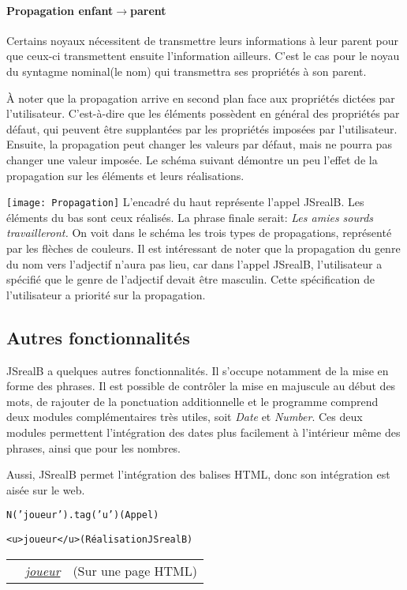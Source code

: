 \documentclass[11pt]{article} %
\newcommand{\real}[1]{\emph{#1}}
\begin{document}
\paragraph{Propagation enfant$\rightarrow$parent}

Certains noyaux nécessitent de transmettre leurs informations à leur
parent pour que ceux-ci transmettent ensuite l'information ailleurs.
C'est le cas pour le noyau du syntagme nominal(le nom) qui transmettra
ses propriétés à son parent.

À noter que la propagation arrive en second plan face aux propriétés
dictées par l'utilisateur. C'est-à-dire que les éléments possèdent
en général des propriétés par défaut, qui peuvent être supplantées
par les propriétés imposées par l'utilisateur. Ensuite, la propagation
peut changer les valeurs par défaut, mais ne pourra pas changer une
valeur imposée. Le schéma suivant démontre un peu l'effet de la propagation
sur les éléments et leurs réalisations.

\texttt{[image: Propagation]}
L'encadré du haut représente l'appel JSrealB. Les éléments du bas sont ceux
réalisés. La phrase finale serait: \real{Les amies sourds travailleront.}
On voit dans le schéma les trois types de propagations, représenté
par les flèches de couleurs. Il est intéressant de noter que la propagation
du genre du nom vers l'adjectif n'aura pas lieu, car dans l'appel
JSrealB, l'utilisateur a spécifié que le genre de l'adjectif devait
être masculin. Cette spécification de l'utilisateur a priorité sur
la propagation.

\subsection{Autres fonctionnalités}

JSrealB a quelques autres fonctionnalités. Il s'occupe notamment de
la mise en forme des phrases. Il est possible de contrôler la mise
en majuscule au début des mots, de rajouter de la ponctuation additionnelle
et le programme comprend deux modules complémentaires très utiles,
soit \emph{Date} et \emph{Number}. Ces deux modules permettent l'intégration
des dates plus facilement à l'intérieur même des phrases, ainsi que
pour les nombres. 

Aussi, JSrealB permet l'intégration des balises HTML, donc son intégration
est aisée sur le web. \\
\begin{alltt}
  N('joueur').tag('u')    (Appel)
    
       <u>joueur</u>      (Réalisation JSrealB)
\end{alltt}
\begin{tabular}{p{1.4cm} p{2.8cm} c}
  & \real{\underline{joueur}} & (Sur une page HTML)
\end{tabular}
\end{document}
